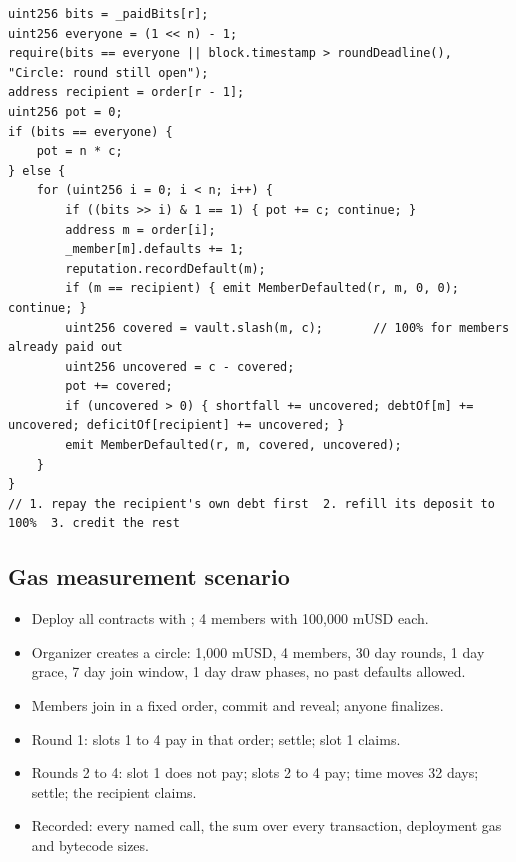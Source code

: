 \begin{lstlisting}[language=Solidity]
uint256 bits = _paidBits[r];
uint256 everyone = (1 << n) - 1;
require(bits == everyone || block.timestamp > roundDeadline(), "Circle: round still open");
address recipient = order[r - 1];
uint256 pot = 0;
if (bits == everyone) {
    pot = n * c;
} else {
    for (uint256 i = 0; i < n; i++) {
        if ((bits >> i) & 1 == 1) { pot += c; continue; }
        address m = order[i];
        _member[m].defaults += 1;
        reputation.recordDefault(m);
        if (m == recipient) { emit MemberDefaulted(r, m, 0, 0); continue; }
        uint256 covered = vault.slash(m, c);       // 100% for members already paid out
        uint256 uncovered = c - covered;
        pot += covered;
        if (uncovered > 0) { shortfall += uncovered; debtOf[m] += uncovered; deficitOf[recipient] += uncovered; }
        emit MemberDefaulted(r, m, covered, uncovered);
    }
}
// 1. repay the recipient's own debt first  2. refill its deposit to 100%  3. credit the rest
\end{lstlisting}

\subsection{Gas measurement scenario}
\begin{itemize}
  \item Deploy all contracts with ; 4 members with 100,000 mUSD each.
  \item Organizer creates a circle: 1,000 mUSD, 4 members, 30 day rounds, 1 day grace, 7 day join window,
        1 day draw phases, no past defaults allowed.
  \item Members join in a fixed order, commit and reveal; anyone finalizes.
  \item Round 1: slots 1 to 4 pay in that order; settle; slot 1 claims.
  \item Rounds 2 to 4: slot 1 does not pay; slots 2 to 4 pay; time moves 32 days; settle; the recipient claims.
  \item Recorded: every named call, the sum over every transaction, deployment gas and bytecode sizes.
\end{itemize}
